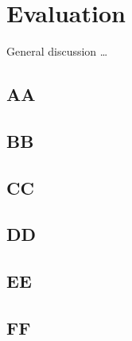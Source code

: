 \chapter{Evaluation}

General discussion \ldots

\section{AA}
\section{BB}
\section{CC}
\section{DD}
\section{EE}
\section{FF}
